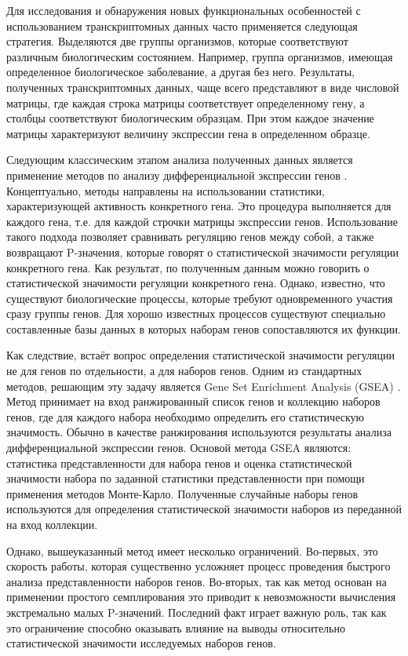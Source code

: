 Для исследования и обнаружения новых функциональных особенностей с использованием транскриптомных данных часто применяется следующая стратегия.
Выделяются две группы организмов, которые соответствуют различным биологическим состоянием.
Например, группа организмов, имеющая определенное биологическое заболевание, а другая без него.
Результаты, полученных транскриптомных данных, чаще всего представляют в виде числовой матрицы, где каждая строка матрицы соответствует определенному гену, а столбцы соответствуют биологическим образцам.
При этом каждое значение матрицы характеризуют величину экспрессии гена в определенном образце.

Следующим классическим этапом анализа полученных данных является применение методов по анализу дифференциальной экспрессии генов \cite{smyth2005limma, love2014moderated, robinson2010edger}. 
Концептуально, методы направлены на использовании статистики, характеризующей активность конкретного гена. 
Это процедура выполняется для каждого гена, т.е. для каждой строчки матрицы экспрессии генов.
Использование такого подхода позволяет сравнивать регуляцию генов между собой, а также возвращают P-значения, которые говорят о статистической значимости регуляции конкретного гена.
Как результат, по полученным данным можно говорить о статистической значимости регуляции конкретного гена.
Однако, известно, что существуют биологические процессы, которые требуют одновременного участия сразу группы генов.
Для хорошо известных процессов существуют специально составленные базы данных \cite{kanehisa2007kegg, liberzon2011molecular} в которых наборам генов сопоставляются их функции.

Как следствие, встаёт вопрос определения статистической значимости регуляции не для генов по отдельности, а для наборов генов.
Одним из стандартных методов, решающим эту задачу является Gene Set Enrichment Analysis (GSEA) \cite{subramanian2005gene}.
Метод принимает на вход ранжированный список генов и коллекцию наборов генов, где для каждого набора необходимо определить его статистическую значимость. 
Обычно в качестве ранжирования используются результаты анализа дифференциальной экспрессии генов.
Основой метода GSEA являются: статистика представленности для набора генов и оценка статистической значимости набора по заданной статистики представленности при помощи применения методов Монте-Карло.
Полученные случайные наборы генов используются для определения статистической значимости наборов из переданной на вход коллекции.

Однако, вышеуказанный метод имеет несколько ограничений.
Во-первых, это скорость работы, которая существенно усложняет процесс проведения быстрого анализа представленности наборов генов.
Во-вторых, так как метод основан на применении простого семплирования это приводит к невозможности вычисления экстремально малых P-значений.
Последний факт играет важную роль, так как это ограничение способно оказывать влияние на выводы относительно статистической значимости исследуемых наборов генов.

